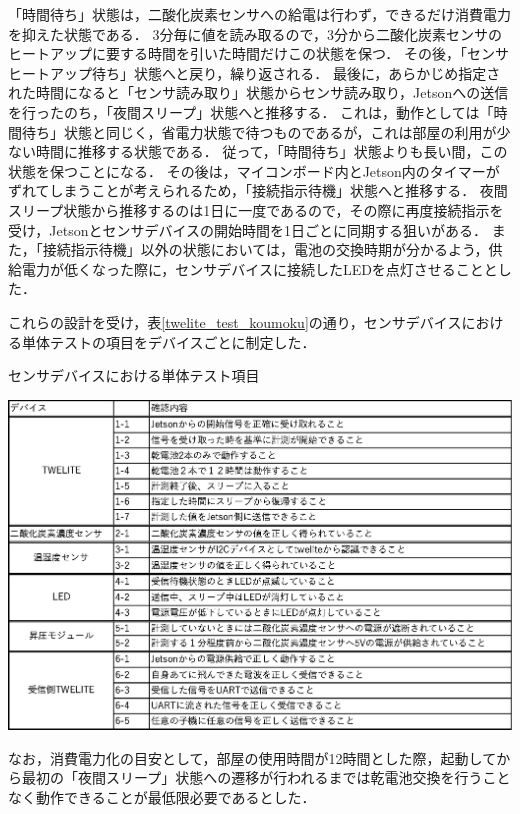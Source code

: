 「時間待ち」状態は，二酸化炭素センサへの給電は行わず，できるだけ消費電力を抑えた状態である．
3分毎に値を読み取るので，3分から二酸化炭素センサのヒートアップに要する時間を引いた時間だけこの状態を保つ．
その後，「センサヒートアップ待ち」状態へと戻り，繰り返される．
最後に，あらかじめ指定された時間になると「センサ読み取り」状態からセンサ読み取り，Jetsonへの送信を行ったのち，「夜間スリープ」状態へと推移する．
これは，動作としては「時間待ち」状態と同じく，省電力状態で待つものであるが，これは部屋の利用が少ない時間に推移する状態である．
従って，「時間待ち」状態よりも長い間，この状態を保つことになる．
その後は，マイコンボード内とJetson内のタイマーがずれてしまうことが考えられるため，「接続指示待機」状態へと推移する．
夜間スリープ状態から推移するのは1日に一度であるので，その際に再度接続指示を受け，Jetsonとセンサデバイスの開始時間を1日ごとに同期する狙いがある．
また，「接続指示待機」以外の状態においては，電池の交換時期が分かるよう，供給電力が低くなった際に，センサデバイスに接続したLEDを点灯させることとした．

これらの設計を受け，表\ref{twelite_test_koumoku}の通り，センサデバイスにおける単体テストの項目をデバイスごとに制定した．
\begin{table}[htbp]
    \centering
    \caption{センサデバイスにおける単体テスト項目}
    \label{twelite_test_koumoku}
    \includegraphics[width = 15cm]{./picture/tantaitest_twelite_koumoku.eps}
\end{table}
なお，消費電力化の目安として，部屋の使用時間が12時間とした際，起動してから最初の「夜間スリープ」状態への遷移が行われるまでは乾電池交換を行うことなく動作できることが最低限必要であるとした．




